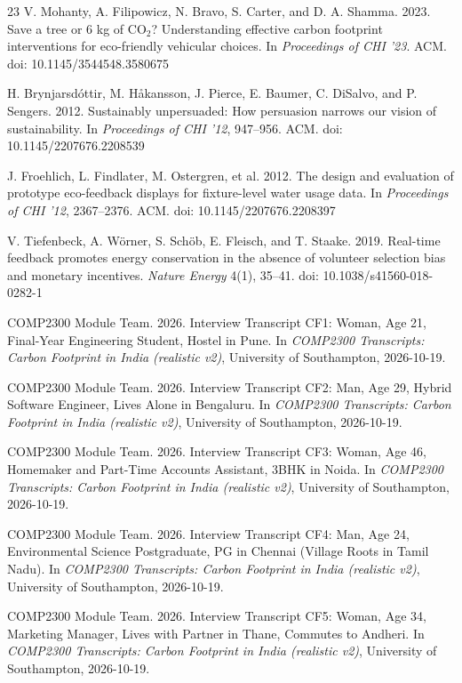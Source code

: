 \documentclass[12pt, a4paper]{article}
\begin{document}
\begin{thebibliography}{23}
V. Mohanty, A. Filipowicz, N. Bravo, S. Carter, and D. A. Shamma. 2023. Save a tree or 6 kg of CO$_2$? Understanding effective carbon footprint interventions for eco-friendly vehicular choices. In \textit{Proceedings of CHI '23}. ACM. doi: 10.1145/3544548.3580675

H. Brynjarsd\'{o}ttir, M. H\aa kansson, J. Pierce, E. Baumer, C. DiSalvo, and P. Sengers. 2012. Sustainably unpersuaded: How persuasion narrows our vision of sustainability. In \textit{Proceedings of CHI '12}, 947--956. ACM. doi: 10.1145/2207676.2208539

J. Froehlich, L. Findlater, M. Ostergren, et al. 2012. The design and evaluation of prototype eco-feedback displays for fixture-level water usage data. In \textit{Proceedings of CHI '12}, 2367--2376. ACM. doi: 10.1145/2207676.2208397

V. Tiefenbeck, A. W\"{o}rner, S. Sch\"{o}b, E. Fleisch, and T. Staake. 2019. Real-time feedback promotes energy conservation in the absence of volunteer selection bias and monetary incentives. \textit{Nature Energy} 4(1), 35--41. doi: 10.1038/s41560-018-0282-1

COMP2300 Module Team. 2026. Interview Transcript CF1: Woman, Age 21, Final-Year Engineering Student, Hostel in Pune. In \textit{COMP2300 Transcripts: Carbon Footprint in India (realistic v2)}, University of Southampton, 2026-10-19.

COMP2300 Module Team. 2026. Interview Transcript CF2: Man, Age 29, Hybrid Software Engineer, Lives Alone in Bengaluru. In \textit{COMP2300 Transcripts: Carbon Footprint in India (realistic v2)}, University of Southampton, 2026-10-19.

COMP2300 Module Team. 2026. Interview Transcript CF3: Woman, Age 46, Homemaker and Part-Time Accounts Assistant, 3BHK in Noida. In \textit{COMP2300 Transcripts: Carbon Footprint in India (realistic v2)}, University of Southampton, 2026-10-19.

COMP2300 Module Team. 2026. Interview Transcript CF4: Man, Age 24, Environmental Science Postgraduate, PG in Chennai (Village Roots in Tamil Nadu). In \textit{COMP2300 Transcripts: Carbon Footprint in India (realistic v2)}, University of Southampton, 2026-10-19.

COMP2300 Module Team. 2026. Interview Transcript CF5: Woman, Age 34, Marketing Manager, Lives with Partner in Thane, Commutes to Andheri. In \textit{COMP2300 Transcripts: Carbon Footprint in India (realistic v2)}, University of Southampton, 2026-10-19.


\end{thebibliography}
\end{document}
